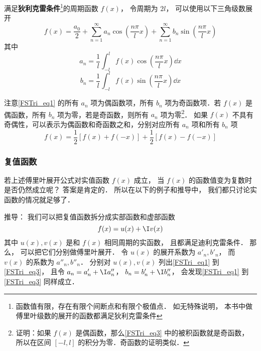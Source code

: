 


满足\textbf{狄利克雷条件}\footnote{函数值有限，存在有限个间断点和有限个极值点． 如无特殊说明， 本书中做傅里叶级数的展开的函数都满足狄利克雷条件}的周期函数 $f(x)$， 令周期为 $2l$， 可以使用以下三角级数展开
\begin{equation}\label{FSTri_eq1}
f( x ) = \frac{a_0}{2} + \sum_{n = 1}^\infty a_n \cos (\frac{n\pi}{l}x) + \sum_{n = 1}^\infty b_n \sin (\frac{n\pi}{l}x)
\end{equation}
其中
\begin{equation}\label{FSTri_eq2}
a_n = \frac{1}{l} \int_{ - l}^l f( x )\cos(\frac{n\pi}{l}x) \dd{x} 
\end{equation}
\begin{equation}\label{FSTri_eq3}
b_n = \frac{1}{l} \int_{ - l}^l f( x )\sin(\frac{n\pi}{l}x) \dd{x}
\end{equation}

注意\autoref{FSTri_eq1} 的所有 $a_n$ 项为偶函数项，所有 $b_n$ 项为奇函数项．若 $f(x)$ 是偶函数，所有 $b_n$ 项为零，若是奇函数，则所有 $a_n$ 项为零\footnote{证明：如果 $f(x)$ 是偶函数，那么\autoref{FSTri_eq3} 中的被积函数就是奇函数， 所以在区间 $[-l,l]$ 的积分为零．奇函数的证明类似．}． 如果 $f(x)$ 不具有奇偶性，可以表示为偶函数和奇函数之和，分别对应所有 $a_n$ 项和所有 $b_n$ 项
\begin{equation}
f(x) = \frac12 [f(x)+f(-x)] + \frac12 [f(x)-f(-x)]
\end{equation}

\subsubsection{复值函数}
若上述傅里叶展开公式对实值函数 $f(x)$ 成立， 当 $f(x)$ 的函数值变为复数时是否仍然成立呢？ 答案是肯定的． 所以在以下的例子和推导中， 我们都只讨论实函数的情况就足够了．

推导： 我们可以把复值函数拆分成实部函数和虚部函数
\begin{equation}
f(x) = u(x) + \I v(x)
\end{equation}
其中 $u(x), v(x)$ 是和 $f(x)$ 相同周期的实函数， 且都满足迪利克雷条件． 那么， 可以把它们分别做傅里叶展开． 令 $u(x)$ 的展开系数为 $a'_n, b'_n$， 而 $v(x)$ 的系数为 $a''_n, b''_n$． 分别对 $u(x), v(x)$ 列出\autoref{FSTri_eq1} 到\autoref{FSTri_eq3}， 且令 $a_n = a'_n + \I a''_n$， $b_n = b'_n + \I b''_n$， 会发现\autoref{FSTri_eq1} 到\autoref{FSTri_eq3} 同样成立．

